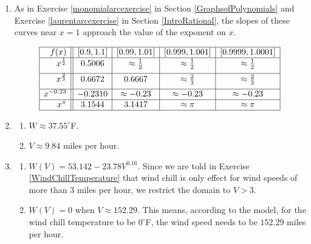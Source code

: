 \documentclass{ximera}
\begin{document}
\begin{enumerate}
\setcounter{enumi}{\value{HW}}

\item As in  Exercise \ref{monomialarcexercise} in Section \ref{GraphsofPolynomials} and Exercise \ref{laurentarcexercise} in Section \ref{IntroRational}, the slopes of these curves near $x = 1$ approach the value of the exponent on $x$.

\[ \begin{array}{|r||c|c|c|c|}  \hline

 f(x) &  [0.9, 1.1] & [0.99, 1.01] &[0.999, 1.001] & [0.9999, 1.0001]  \\ \hline
 x^{\frac{1}{2}} & 0.5006 & \approx \frac{1}{2} & \approx \frac{1}{2} & \approx \frac{1}{2} \\ [5pt] \hline
 x^{\frac{2}{3}} & 0.6672 & 0.6667 & \approx \frac{2}{3} & \approx \frac{2}{3}  \\ [5pt] \hline
 x^{-0.23} & -0.2310 & \approx -0.23 &\approx -0.23 &  \approx -0.23  \\  \hline
 x^{\pi}  &3.1544 & 3.1417 & \approx \pi & \approx \pi   \\  \hline

\end{array} \]

\item

\begin{enumerate}

\item  $W \approx 37.55^{\circ}$F.

\item  $V \approx 9.84$ miles per hour.

\end{enumerate}

\item 

\begin{enumerate}

\item $W(V) = 53.142 - 23.78 V^{0.16}$.  Since we are told in Exercise \ref{WindChillTemperature} that wind chill is only effect for wind speeds of more than 3 miles per hour, we restrict the domain to $V > 3$.

\item $W(V)=0$ when $V \approx 152.29$.  This means, according to the model, for the wind chill temperature to be $0^{\circ}$F, the wind speed needs to be $152.29$ miles per hour.


\end{enumerate}
\end{enumerate}
\end{document}
